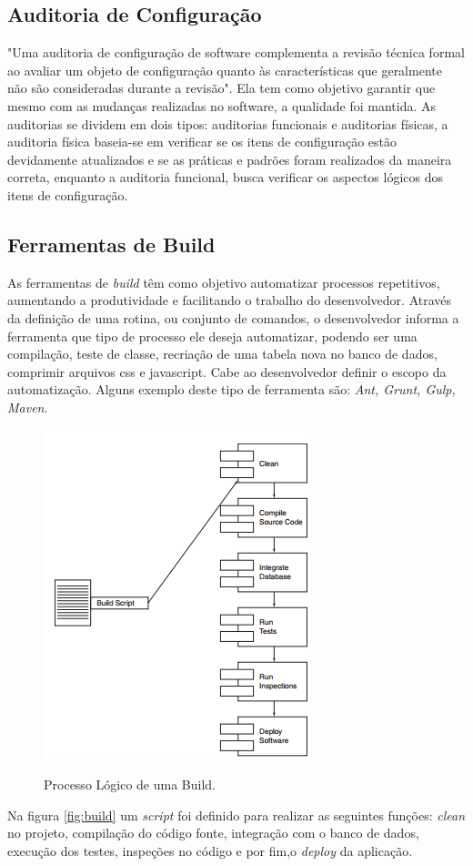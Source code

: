 \subsection{Auditoria de Configuração}
"Uma auditoria de configuração de software complementa a revisão técnica formal ao avaliar um objeto de configuração quanto às características que geralmente não são consideradas durante a revisão"\space{}. Ela tem como objetivo garantir que mesmo com as mudanças realizadas no software, a qualidade foi mantida. As auditorias se dividem em dois tipos: auditorias funcionais e auditorias físicas, a auditoria física baseia-se em verificar se os itens de configuração estão devidamente atualizados e se as práticas e padrões foram realizados da maneira correta, enquanto a auditoria funcional, busca verificar os aspectos lógicos dos itens de configuração.
\subsection{Ferramentas de Build}
As ferramentas de \textit{build} têm como objetivo automatizar processos repetitivos, aumentando a produtividade e facilitando o trabalho do desenvolvedor. Através da definição de uma rotina, ou conjunto de comandos, o desenvolvedor informa a ferramenta que tipo de processo ele deseja automatizar, podendo ser uma compilação, teste de classe, recriação de uma tabela nova no banco de dados, comprimir arquivos css e javascript. Cabe ao desenvolvedor definir o escopo da automatização. Alguns exemplo deste tipo de ferramenta são: \textit{Ant, Grunt, Gulp, Maven}.


\begin{figure}[H]
\centering
\caption[Processo Lógico de uma Build]{Processo Lógico de uma Build.}
\includegraphics[scale=0.9]{./images/build}
\label{fig:build}
\end{figure}
Na figura \autoref{fig:build} um \textit{script} foi definido para realizar as seguintes funções: \textit{clean} no projeto, compilação do código fonte, integração com o banco de dados, execução dos testes, inspeções no código e por fim,o \textit{deploy} da aplicação.


